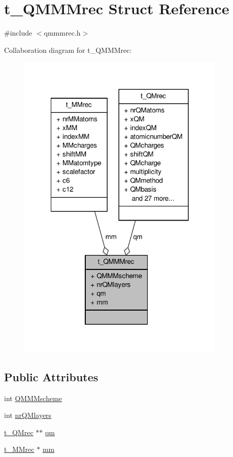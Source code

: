 \hypertarget{structt__QMMMrec}{\section{t\-\_\-\-Q\-M\-M\-Mrec \-Struct \-Reference}
\label{structt__QMMMrec}
}


{\ttfamily \#include $<$qmmmrec.\-h$>$}



\-Collaboration diagram for t\-\_\-\-Q\-M\-M\-Mrec\-:
\nopagebreak
\begin{figure}[H]
\begin{center}
\leavevmode
\includegraphics[width=282pt]{structt__QMMMrec__coll__graph}
\end{center}
\end{figure}
\subsection*{\-Public \-Attributes}
\begin{DoxyCompactItemize}
\item 
int \hyperlink{structt__QMMMrec_a83cc5d05c3e19488416e2f41479449c5}{\-Q\-M\-M\-Mscheme}
\item 
int \hyperlink{structt__QMMMrec_a2dd95e630a6ba85a5a56abf317f68b42}{nr\-Q\-Mlayers}
\item 
\hyperlink{structt__QMrec}{t\-\_\-\-Q\-Mrec} $\ast$$\ast$ \hyperlink{structt__QMMMrec_a0398b50578ef1103ef070bbbf89a817c}{qm}
\item 
\hyperlink{structt__MMrec}{t\-\_\-\-M\-Mrec} $\ast$ \hyperlink{structt__QMMMrec_a31dc1d1e891c048946eb47ff27f05aef}{mm}
\end{DoxyCompactItemize}


